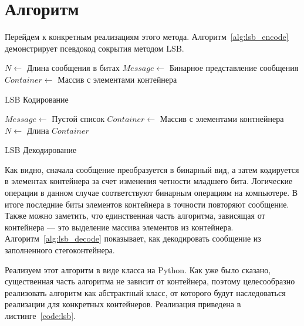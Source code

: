 \section{Алгоритм}
Перейдем к конкретным реализациям этого метода. Алгоритм~\ref{alg:lsb_encode}
демонстрирует псевдокод сокрытия методом LSB.
\begin{algorithm}[ht!]
     $N \leftarrow$ Длина сообщения в битах\;
     $Message \leftarrow$ Бинарное представление сообщения\;
     $Container \leftarrow$ Массив с элементами контейнера\;
     \caption{LSB Кодирование}
    \label{alg:lsb_encode}
\end{algorithm}
\begin{algorithm}[ht!]
    $Message \leftarrow$ Пустой список\;
    $Container \leftarrow$ Массив с элементами контнейнера\;
    $N \leftarrow$ Длина $Container$\;
    \caption{LSB Декодирование}
    \label{alg:lsb_decode}
\end{algorithm}

Как видно, сначала сообщение преобразуется в бинарный вид,
а затем кодируется в элементах контейнера за счет изменения четности младшего бита.
Логические операции в данном случае соответствуют бинарным операциям на компьютере.
В итоге последние биты элементов контейнера в точности повторяют сообщение.
Также можно заметить, что единственная часть алгоритма, зависящая от контейнера
--- это выделение массива элементов из контейнера. Алгоритм~\ref{alg:lsb_decode}
показывает, как декодировать сообщение из заполненного стегоконтейнера.

Реализуем этот алгоритм в виде класса на Python. Как уже было сказано,
существенная часть алгоритма не зависит от контейнера,
поэтому целесообразно реализовать алгоритм как абстрактный класс,
от которого будут наследоваться реализации для конкретных контейнеров.
Реализация приведена в листинге~\ref{code:lsb}.


